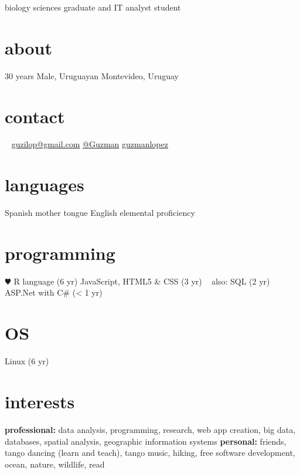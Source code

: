 \documentclass[]{friggeri-cv} %
\begin{document}
{biology sciences graduate and IT analyst student} %


\begin{aside} %
	
\section{about}
30 years
Male, Uruguayan	
{\color{orange} \faHome{}} Montevideo, Uruguay
\section{contact}~
{\color{green} \faEnvelope{}} \href{mailto:guzilop@gmail.com}{guzilop@gmail.com}
{\color{blue} \faSend{}} \href{https://telegram.me/Guzman}{@Guzman}
\faGithubAlt{} \href{https://github.com/guzmanlopez}{guzmanlopez}
\section{languages}
Spanish mother tongue
English elemental proficiency
\section{programming}
{\color{red} $\varheartsuit$} R language (6 yr)
JavaScript, HTML5 \& CSS (3 yr)
~
also:
SQL (2 yr)
ASP.Net with C\# (< 1 yr)
\section{OS}
{\color{gray}\FA \faLinux} Linux (6 yr)
\end{aside}

\section{interests}

\textbf{professional:} data analysis, programming, research, web app creation, big data, databases, spatial analysis, geographic information systems \textbf{personal:} friends, tango dancing (learn and teach), tango music, hiking, free software development, ocean, nature, wildlife, read\\
\end{document}
